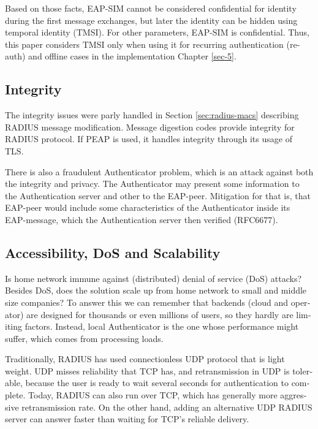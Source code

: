 \documentclass[12pt,a4paper,english]{tutthesis}
\begin{document}
\begin{otherlanguage}{english}
Based on those facts, EAP-SIM cannot be considered confidential for identity
during the first message exchanges, but later the identity can be hidden
using temporal identity (TMSI). 
For other parameters, EAP-SIM is confidential.
Thus, this paper considers TMSI only when using it for recurring
authentication (re-auth) and offline cases in the implementation Chapter
\ref{sec-5}.
\subsection{Integrity}
\label{sec-6-1-2}



The integrity issues were parly handled in Section \ref{sec:radius-macs} describing
RADIUS message modification.
Message digestion codes provide integrity for RADIUS protocol.
If PEAP is used, it handles integrity through its usage of
 TLS\cite{peap}.

There is also a fraudulent Authenticator problem, which is an attack
against both the integrity and privacy.  The Authenticator may present
some information to the Authentication server and other to the
EAP-peer. Mitigation for that is, that EAP-peer would include some
characteristics of the Authenticator inside its EAP-message, which
the Authentication server then verified (RFC6677)\cite{rfc6677}.

\subsection{Accessibility, DoS and Scalability}
\label{sec-6-1-3}

Is home network immune against (distributed) denial of service (DoS)
attacks? Besides DoS, does the solution scale up from home network to
small and middle size companies?
To answer this we can remember that backends (cloud and operator) are
designed for thousands or even millions of users, so 
they hardly are limiting factors. Instead, local
Authenticator is the one whose performance might suffer, which
comes from processing loads\cite{2009-lin-simefficiency}.


Traditionally, RADIUS has used connection\-less UDP protocol that is
light weight. UDP misses reliability that TCP has, and retransmission in UDP is
tolerable, because the user is ready to wait  several seconds for
authentication to complete. Today, RADIUS can also run over TCP, which
has generally more aggressive retransmission
rate\cite[Section 2.2.1]{rfc5080}. 
On the other hand, adding an
alternative UDP RADIUS server can answer faster than waiting for TCP's reliable delivery.



\end{otherlanguage}
\end{document}
